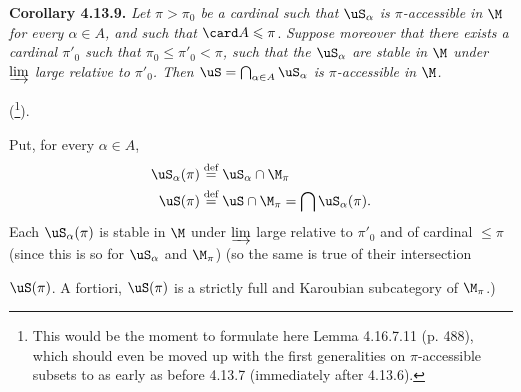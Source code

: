 \textbf{Corollary 4.13.9.} \textit{Let $\pi > \pi_0$ be a cardinal such that $\uS_\alpha$ is $\pi$-accessible in $\M$ for every $\alpha \in A$, and such that} $\card A \leqslant \pi$. \textit{Suppose moreover that there exists a cardinal $\pi'_0$ such that $\pi_0 \leqslant \pi'_0 < \pi$, such that the $\uS_\alpha$ are stable in $\M$ under $\varinjlim$ large relative to $\pi'_0$. Then $\uS = \bigcap_{\alpha\in A} \uS_\alpha$ is $\pi$-accessible in $\M$.}

(\footnote[124]{This would be the moment to formulate here Lemma 4.16.7.11 (p. 488), which should even be moved up with the first generalities on $\pi$-accessible subsets to as early as before 4.13.7 (immediately after 4.13.6).}).

Put, for every $\alpha \in A$,
\[
\begin{aligned}
\uS_\alpha(\pi) &\overset{\text{def}}{=} \uS_\alpha \cap \M_\pi \\
\uS(\pi) &\overset{\text{def}}{=} \uS \cap \M_\pi = \bigcap \uS_\alpha(\pi) .
\end{aligned}
\]
Each $\uS_\alpha(\pi)$ is stable in $\M$ under $\varinjlim$ large relative to $\pi'_0$ and of cardinal $\leqslant \pi$ (since this is so for $\uS_\alpha$ and $\M_\pi$) (so the same is true of their intersection

$\uS(\pi)$. A fortiori, $\uS(\pi)$ is a strictly full and Karoubian subcategory of $\M_\pi$.)